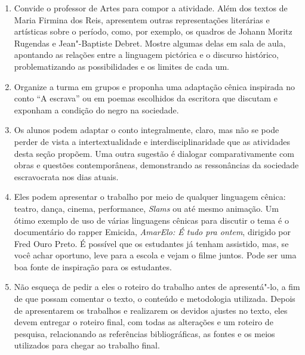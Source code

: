 \documentclass[12pt]{extarticle}
\begin{document}
\begin{enumerate}
\item
Convide o professor de Artes para compor a atividade. 
Além dos textos de Maria Firmina dos Reis, apresentem outras 
representações literárias e artísticas sobre o período,
como, por exemplo, os quadros de Johann Moritz Rugendas e Jean"-Baptiste
Debret. Mostre algumas delas em sala de aula, apontando as relações
entre a linguagem pictórica e o discurso histórico, problematizando as
possibilidades e os limites de cada um.






\item
Organize a turma em grupos e proponha uma adaptação cênica inspirada
no conto ``A escrava'' ou em poemas escolhidos da escritora que discutam
e exponham a condição do negro na sociedade.

\item
Os alunos podem adaptar o conto integralmente, claro, mas não se pode
perder de vista a intertextualidade e interdisciplinaridade que as
atividades desta seção propõem. Uma outra sugestão é dialogar
comparativamente com obras e questões contemporâneas, demonstrando as
ressonâncias da sociedade escravocrata nos dias atuais.

\item
Eles podem apresentar o trabalho por meio de qualquer linguagem
cênica: teatro, dança, cinema, performance, \emph{Slams} ou até mesmo
animação. Um ótimo exemplo de uso de várias linguagens cênicas para
discutir o tema é o documentário do rapper Emicida, \emph{AmarElo: É
tudo pra ontem}, dirigido por Fred Ouro Preto. É possível que os
estudantes já tenham assistido, mas, se você achar oportuno, leve para a
escola e vejam o filme juntos. Pode ser uma boa fonte de inspiração para
os estudantes.

\item
Não esqueça de pedir a eles o roteiro do trabalho antes de
apresentá"-lo, a fim de que possam comentar o texto, o conteúdo e
metodologia utilizada. Depois de apresentarem os trabalhos e realizarem
os devidos ajustes no texto, eles devem entregar o roteiro final, com
todas as alterações e um roteiro de pesquisa, relacionando as
referências bibliográficas, as fontes e os meios utilizados para chegar
ao trabalho final.
\end{enumerate}
\end{document}
